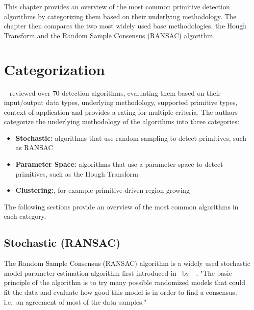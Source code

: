 This chapter provides an overview of the most common primitive detection algorithms by categorizing them based on their underlying methodology.
The chapter then compares the two most widely used base methodologies,
the Hough Transform and the Random Sample Consensus (RANSAC) algorithm.


\section{Categorization}
\citeauthor{kaiser_survey_2019}~\cite{kaiser_survey_2019} reviewed over 70 detection algorithms, evaluating them based on their input/output data types,
underlying methodology, supported primitive types, context of application and provides a rating for multiple criteria.
The authors categorize the underlying methodology of the algorithms into three categories:
\begin{itemize}
    \item \textbf{Stochastic:} algorithms that use random sampling to detect primitives, such as RANSAC
    \item \textbf{Parameter Space:} algorithms that use a parameter space to detect primitives, such as the Hough Transform
    \item \textbf{Clustering:}, for example primitive-driven region growing
\end{itemize}

The following sections provide an overview of the most common algorithms in each category.

\subsection{Stochastic (RANSAC)}
The Random Sample Consensus (RANSAC) algorithm is a widely used stochastic model parameter estimation
algorithm first introduced in~\citeyear{fischler_random_1981}
by~\citeauthor{fischler_random_1981}~\cite{fischler_random_1981}.
"The basic principle of the algorithm is to try many possible randomized models that could fit
the data and evaluate how good this model is in order to find a consensus,
i.e.\ an agreement of most of the data samples."~\parencite{kaiser_survey_2019}

